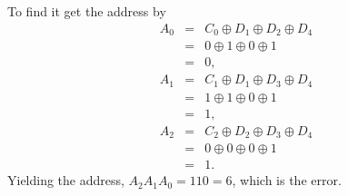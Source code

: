 To find it get the address by
\begin{eqnarray*}
  A_0 &=& C_0 \oplus D_1 \oplus D_2 \oplus D_4 \\
      &=& 0 \oplus 1 \oplus 0 \oplus 1 \\
      &=& 0, \\
  A_1 &=& C_1 \oplus D_1 \oplus D_3 \oplus D_4 \\
      &=& 1 \oplus 1 \oplus 0 \oplus 1 \\
      &=& 1, \\
  A_2 &=& C_2 \oplus D_2 \oplus D_3 \oplus D_4 \\
      &=& 0 \oplus 0 \oplus 0 \oplus 1 \\
      &=& 1.
\end{eqnarray*}
Yielding the address, $A_2A_1A_0=110=6$, which is the error.

\vspace{.1in}\noindent
{}

